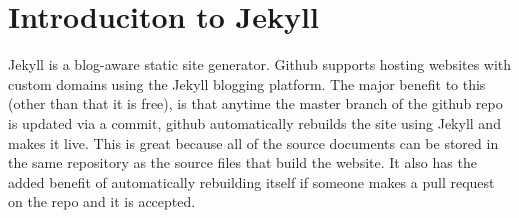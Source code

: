 \section{Introduciton to Jekyll}

Jekyll is a blog-aware static site generator. Github supports hosting websites with custom domains using the Jekyll blogging platform. The major benefit to this (other than that it is free), is that anytime the master branch of the github repo is updated via a commit, github automatically rebuilds the site using Jekyll and makes it live. This is great because all of the source documents can be stored in the same repository as the source files that build the website. It also has the added benefit of automatically rebuilding itself if someone makes a pull request on the repo and it is accepted.







